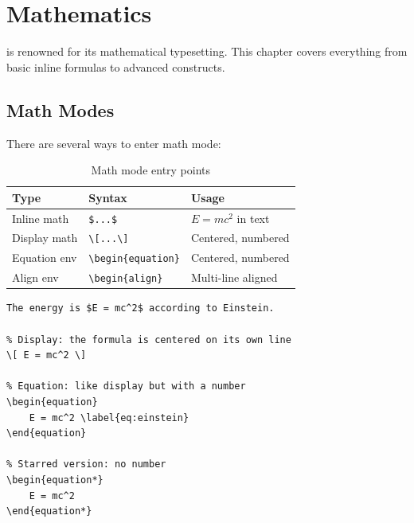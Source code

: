 
\chapter{Mathematics}

\latex{} is renowned for its mathematical typesetting. This chapter covers everything from basic inline formulas to advanced constructs.

\section{Math Modes}

There are several ways to enter math mode:

\begin{table}[H]
\centering
\begin{tabular}{lll}
\toprule
\textbf{Type} & \textbf{Syntax} & \textbf{Usage} \\
\midrule
Inline math   & \verb|$...$|            & $E=mc^2$ in text \\
Display math  & \verb|\[...\]|          & Centered, numbered \\
Equation env  & \verb|\begin{equation}| & Centered, numbered \\
Align env     & \verb|\begin{align}|    & Multi-line aligned \\
\bottomrule
\end{tabular}
\caption{Math mode entry points}
\end{table}

\begin{lstlisting}[language={[LaTeX]TeX}, caption=Math modes]
% Inline: the formula flows with text
The energy is $E = mc^2$ according to Einstein.

% Display: the formula is centered on its own line
\[ E = mc^2 \]

% Equation: like display but with a number
\begin{equation}
    E = mc^2 \label{eq:einstein}
\end{equation}

% Starred version: no number
\begin{equation*}
    E = mc^2
\end{equation*}
\end{lstlisting}

